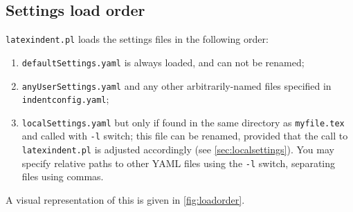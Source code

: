 \subsection{Settings load order}\label{sec:loadorder}
	\texttt{latexindent.pl} loads the settings files in the following order:
	\begin{enumerate}
		\item \texttt{defaultSettings.yaml} is always loaded, and can not be renamed;
		\item \texttt{anyUserSettings.yaml} and any other arbitrarily-named files specified in \texttt{indentconfig.yaml};
		\item \texttt{localSettings.yaml} but only if found in the same directory as \texttt{myfile.tex} and called
		      with \texttt{-l} switch; this file can be renamed, provided that the call to \texttt{latexindent.pl} is adjusted
		      accordingly (see \cref{sec:localsettings}). You may specify relative  paths to other
		      YAML files using the \texttt{-l} switch, separating files using commas.
	\end{enumerate}
	A visual representation of this is given in \cref{fig:loadorder}.

